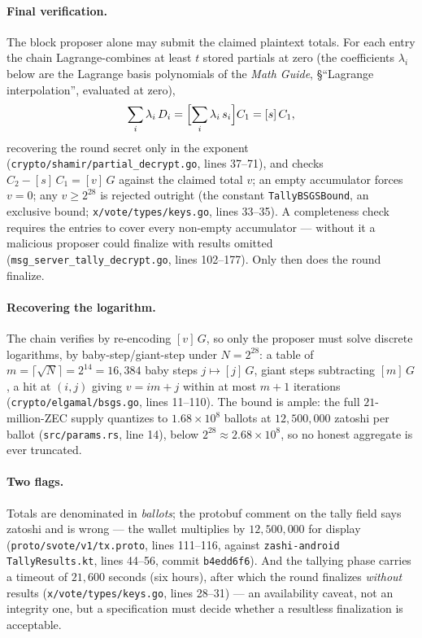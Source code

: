 \documentclass[11pt,a4paper]{article}
\theoremstyle{definition}
\begin{document}
\paragraph{Final verification.} The block proposer alone may submit the
claimed plaintext totals. For each entry the chain Lagrange-combines at
least $t$ stored partials at zero (the coefficients $\lambda_i$ below are
the Lagrange basis polynomials of the \emph{Math Guide}, \S``Lagrange
interpolation'', evaluated at zero),
\[
\sum_i \lambda_i\, D_i = \Bigl[\sum_i \lambda_i\, s_i\Bigr] C_1 =
[s]\,C_1,
\]
recovering the round secret only in the exponent
(\texttt{crypto/\allowbreak shamir/\allowbreak partial\_\allowbreak decrypt.go},
lines 37--71), and checks
$C_2 - [s]\,C_1 = [v]\,G$ against the claimed total $v$; an empty
accumulator forces $v = 0$; any $v \geq 2^{28}$ is rejected outright (the
constant \texttt{TallyBSGSBound}, an exclusive bound;
\texttt{x/vote/types/keys.go}, lines 33--35). A completeness check requires
the entries to cover every non-empty accumulator --- without it a malicious
proposer could finalize with results omitted
(\texttt{msg\_server\_tally\_decrypt.go}, lines 102--177). Only then does
the round finalize.

\paragraph{Recovering the logarithm.} The chain verifies by re-encoding
$[v]\,G$, so only the proposer must solve discrete logarithms, by
baby-step/giant-step under $N = 2^{28}$: a table of $m = \lceil \sqrt{N}
\rceil = 2^{14} = 16{,}384$ baby steps $j \mapsto [j]\,G$, giant steps
subtracting $[m]\,G$, a hit at $(i, j)$ giving $v = i m + j$ within at most
$m + 1$ iterations (\texttt{crypto/elgamal/bsgs.go}, lines 11--110). The
bound is ample: the full $21$-million-ZEC supply quantizes to
$1.68 \times 10^{8}$ ballots at $12{,}500{,}000$ zatoshi per ballot
(\texttt{src/params.rs}, line 14), below $2^{28} \approx 2.68 \times
10^{8}$, so no honest aggregate is ever truncated.

\paragraph{Two flags.}
\begin{sloppypar}
Totals are denominated in \emph{ballots}; the
protobuf comment on the tally field says zatoshi and is wrong --- the wallet
multiplies by $12{,}500{,}000$ for display
(\texttt{proto/svote/v1/tx.proto}, lines 111--116, against
\texttt{zashi-android} \texttt{TallyResults.kt}, lines 44--56, commit
\texttt{b4edd6f6}). And the tallying phase carries a timeout of $21{,}600$
seconds (six hours), after which the round finalizes \emph{without}
results (\texttt{x/vote/types/keys.go}, lines 28--31) --- an availability
caveat, not an integrity one, but a specification must decide whether a
resultless finalization is acceptable.
\end{sloppypar}
\end{document}
